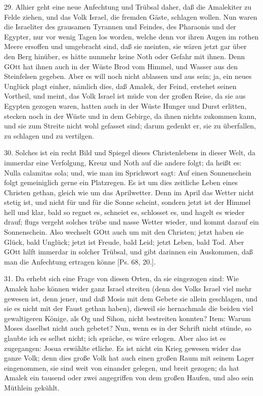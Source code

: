 29. Alhier geht eine neue Anfechtung und Trübsal daher, daß die Amalekiter zu Felde ziehen, und das Volk Israel, die fremden Gäste, schlagen wollen. Nun waren die Israeliter des grausamen Tyrannen und Feindes, des Pharaonis und der Egypter, nur vor wenig Tagen los worden, welche denn vor ihren Augen im rothen Meere ersoffen und umgebracht sind, daß sie meinten, sie wären jetzt gar über den Berg hinüber, es hätte nunmehr keine Noth oder Gefahr mit ihnen. Denn GOtt hat ihnen auch in der Wüste Brod vom Himmel, und Wasser aus den Steinfelsen gegeben. Aber es will noch nicht ablassen und aus sein; ja, ein neues Unglück plagt einher, nämlich dies, daß Amalek, der Feind, erstehet seinen Vortheil, und meint, das Volk Israel ist müde von der großen Reise, da sie aus Egypten gezogen waren, hatten auch in der Wüste Hunger und Durst erlitten, stecken noch in der Wüste und in dem Gebirge, da ihnen nichts zukommen kann, und sie zum Streite nicht wohl gefasset sind; darum gedenkt er, sie zu überfallen, zu schlagen und zu vertilgen.

30. Solches ist ein recht Bild und Spiegel dieses Christenlebens in dieser Welt, da immerdar eine Verfolgung, Kreuz und Noth auf die andere folgt; da heißt es: Nulla calamitas sola; und, wie man im Sprichwort sagt: Auf einen Sonnenschein folgt gemeiniglich gerne ein Platzregen. Es ist um dies zeitliche Leben eines Christen gethan, gleich wie um das Aprilwetter. Denn im April das Wetter nicht stetig ist, und nicht für und für die Sonne scheint, sondern jetzt ist der Himmel hell und klar, bald so regnet es, schneiet es, schlosset es, und hagelt es wieder drauf; flugs vergeht solches trübe und nasse Wetter wieder, und kommt darauf ein Sonnenschein. Also wechselt GOtt auch um mit den Christen; jetzt haben sie Glück, bald Unglück; jetzt ist Freude, bald Leid; jetzt Leben, bald Tod. Aber GOtt hilft immerdar in solcher Trübsal, und gibt darinnen ein Auskommen, daß man die Anfechtung ertragen könne [Ps. 68, 20.].

31. Da erhebt sich eine Frage von diesen Orten, da sie eingezogen sind: Wie Amalek habe können wider ganz Israel streiten (denn des Volks Israel viel mehr gewesen ist, denn jener, und daß Mosis mit dem Gebete sie allein geschlagen, und sie es nicht mit der Faust gethan haben), dieweil sie hernachmals die beiden viel gewaltigeren Könige, als Og und Sihon, nicht bestreiten konnten? Item: Warum Moses daselbst nicht auch gebetet? Nun, wenn es in der Schrift nicht stünde, so glaubte ich es selbst nicht; ich spräche, es wäre erlogen. Aber also ist es zugegangen: Josua erwählte etliche. Es ist nicht ein Krieg gewesen wider das ganze Volk; denn dies große Volk hat auch einen großen Raum mit seinem Lager eingenommen, sie sind weit von einander gelegen, und breit gezogen; da hat Amalek ein tausend oder zwei angegriffen von dem großen Haufen, und also sein Müthlein gekühlt.

